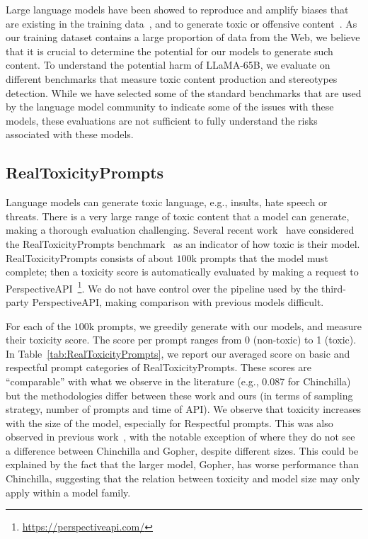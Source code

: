Large language models have been showed to reproduce and amplify biases that are existing in the training data~\citep{sheng2019woman,kurita2019quantifying}, and to generate toxic or offensive content~\citep{gehman2020realtoxicityprompts}. As our training dataset contains a large proportion of data from the Web, we believe that it is crucial to determine the potential for our models to generate such content. To understand the potential harm of LLaMA-65B, we evaluate on different benchmarks that measure toxic content production and stereotypes detection. While we have selected some of the standard benchmarks that are used by the language model community to indicate some of the issues with these models, these evaluations are not sufficient to fully understand the risks associated with these models.

\subsection{RealToxicityPrompts}

Language models can generate toxic language, e.g.,  insults, hate speech or threats. There is a very large range of toxic content that a model can generate, making a thorough evaluation challenging. Several recent work~\cite{zhang2022opt, hoffmann2022chinchilla} have considered the RealToxicityPrompts benchmark~\cite{gehman2020realtoxicityprompts} as an indicator of how toxic is their model. RealToxicityPrompts consists of about $100$k prompts that the model must complete; then a toxicity score is automatically evaluated by making a request to PerspectiveAPI~\footnote{\url{https://perspectiveapi.com/}}. 
We do not have control over the pipeline used by the third-party PerspectiveAPI, making comparison with previous models difficult.

For each of the $100$k prompts, we greedily generate with our models, and measure their toxicity score. The score per prompt ranges from 0 (non-toxic) to 1 (toxic). In Table~\ref{tab:RealToxicityPrompts}, we report our averaged score on basic and respectful prompt categories of RealToxicityPrompts. These scores are ``comparable'' with what we observe in the literature (e.g., 0.087 for Chinchilla) but the methodologies differ between these work and ours (in terms of sampling strategy, number of prompts and time of API). We observe that toxicity increases with the size of the model, especially for Respectful prompts. This was also observed in previous work~\cite{zhang2022opt}, with the notable exception of \citet{hoffmann2022chinchilla} where they do not see a difference between Chinchilla and Gopher, despite different sizes. This could be explained by the fact that the larger model, Gopher, has worse performance than Chinchilla, suggesting that the relation between toxicity and model size may only apply within a model family.

